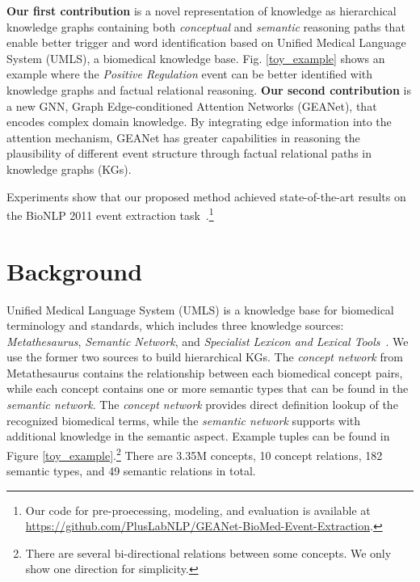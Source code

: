 \documentclass[11pt,a4paper]{article}
\makeatletter
\newcommand{\GAENet}{\textrm{GEANet}}
\newcommand{\GAENetFull}{Graph Edge-conditioned Attention Networks}
\renewcommand\paragraph{\@startsection{paragraph}{4}{\z@}{.25ex \@plus.5ex \@minus.2ex}{-1em}{\normalfont\normalsize\bfseries}}
\makeatother
\begin{document}
\textbf{Our first contribution} is a novel representation of knowledge as hierarchical knowledge graphs containing both \textit{conceptual} and \textit{semantic} reasoning paths that enable better trigger and word identification based on Unified Medical Language System (UMLS), a biomedical knowledge base. Fig. \ref{toy_example} shows an example where the \textit{Positive Regulation} event can be better identified with knowledge graphs and factual relational reasoning. \textbf{Our second contribution} is a new GNN, \GAENetFull{} (\GAENet), that encodes complex domain knowledge. By integrating edge information into the attention mechanism, \GAENet{} has greater capabilities in reasoning the plausibility of different event structure through factual relational paths in knowledge graphs (KGs).













Experiments show that 
our proposed method achieved state-of-the-art results on the BioNLP 2011 event extraction task~\cite{kim2011overview}.\footnote{Our code for pre-proecessing, modeling,  and evaluation is available at \url{https://github.com/PlusLabNLP/GEANet-BioMed-Event-Extraction}.}



















 \section{Background} \label{sec:background}


\paragraph{UMLS Knowledge Base.}
\label{UMLS_KB}
Unified Medical Language System (UMLS) is a knowledge base for biomedical terminology and standards, which includes three knowledge sources: \textit{Metathesaurus}, \textit{Semantic Network}, and \textit{Specialist Lexicon and Lexical Tools}~\cite{bodenreider2004unified}. We use the former two sources to build hierarchical KGs. The \textit{concept network} from Metathesaurus contains the relationship between each biomedical concept pairs, while each concept contains one or more semantic types that can be found in the \textit{semantic network}. 
The \textit{concept network} provides direct definition lookup of the recognized biomedical terms, while the \textit{semantic network} supports with additional knowledge in the semantic aspect. Example tuples can be found in Figure \ref{toy_example}.\footnote{There are several bi-directional relations between some concepts. We only show one direction for simplicity.} There are 3.35M concepts, 10 concept relations, 182 semantic types, and 49 semantic relations in total. 
\end{document}

